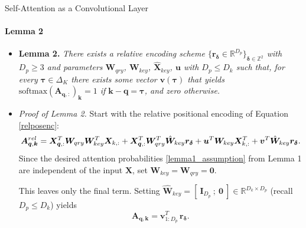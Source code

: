 \documentclass[9pt]{beamer}
\newcommand{\bb}{\mathbb}
\newcommand{\mb}{\bm}
\begin{document}
\begin{frame}{Self-Attention as a Convolutional Layer}
\framesubtitle{Lemma 2}
\begin{itemize}
\item \textbf{Lemma 2.} {\em There exists a relative encoding scheme $\{\bm r_{\bm \delta} \in \bb R^{D_p}\}_{\bm \delta\in\bb Z^2}$ with $D_p\geq 3$ and parameters $\bm W_{qry}$, $\bm W_{key}$, $\hat{\bm X}_{key}$, $\bm u$ with $D_p\leq D_k$ such that, for every $\bm\tau \in \Delta_K$ there exists some vector $\bm v(\bm\tau)$ that yields $\mathrm{softmax}(\bm A_{\bm q,:})_{\bm k}=1$ if $\bm k - \bm q = \bm\tau$, and zero otherwise.}

\vspace{.1in}
\item \textit{Proof of Lemma 2.} Start with the relative positional encoding of Equation \eqref{relposenc}:
\begin{equation*}
    \mb A^{rel}_{\mb q, \mb k} = 
        \mb X_{\mb q,:}^T \WW \mb X_{k,:}
        + \mb X_{\mb q,:}^T \mb W_{qry}^T\hat{\mb W}_{key} \mb r_{\mb \delta}
        + \mb u^T \mb W_{key} \mb X^T_{k,:}
        + \mb v^T \hat{\mb W}_{key} \mb r_{\bm\delta}.
\end{equation*}
Since the desired attention probabilities \eqref{lemma1_assumption} from Lemma 1 are independent of the input $\bm X$, set $\bm W_{key}=\bm W_{qry} = \bm 0$. 

\vspace{.1in}
This leaves only the final term. Setting $\hat{\bm W}_{key} = [\ \bm I_{D_p}\ ; \ \bm 0\ ] \in \mathbb R^{D_k\times D_p}$ (recall $D_p\leq D_k$) yields
\begin{equation*}
    \mb A_{\mb q, \mb k} = \mb v_{1:D_p}^T\, \mb r_{\bm\delta}.
\end{equation*}
\end{itemize}
\end{frame}
\end{document}
